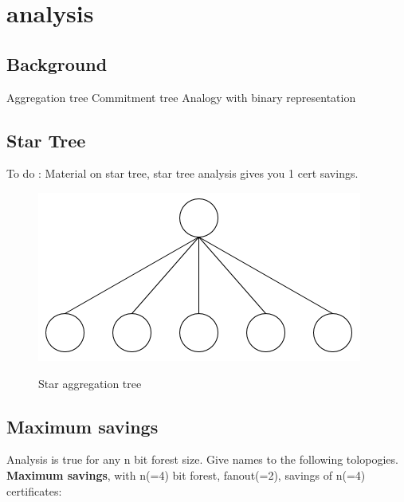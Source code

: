 \chapter{analysis}

\section{Background}
	Aggregation tree
	Commitment tree
	Analogy with binary representation
\section{Star Tree}
	
	To do : Material on star tree, star tree analysis gives you 1 cert savings.

	\begin{figure}[H]\label{star-aggregation-tree}
  	\centering
  		\includegraphics[scale=0.4]{images/star-tree.png}\\
  		\caption{Star aggregation tree}
  \end{figure}

\newpage

\section{Maximum savings}
	Analysis is true for any n bit forest size.	Give names to the following tolopogies.  
	\textbf{Maximum savings}, with n(=4) bit forest, fanout(=2), savings of n(=4) certificates:

